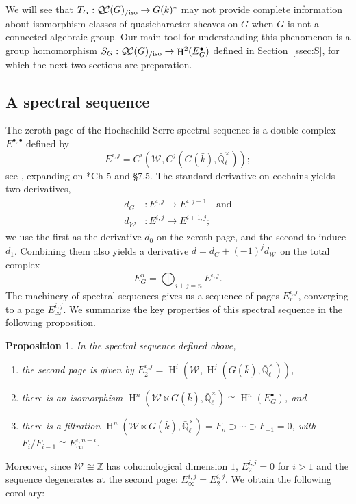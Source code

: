 \documentclass[CM,Submssn,SecEq]{degruyter-crelle} %
\theoremstyle{plain}
\newtheorem{proposition}[theorem]{Proposition}
\theoremstyle{definition}
\theoremstyle{remark}
\newcommand{\ZZ}{{\mathbb{Z}}}
\newcommand{\EE}{\mathbb{\bar Q}_\ell}
\newcommand{\bFq}{\bar{k}}
\newcommand{\Fq}{k}
\newcommand{\EEx}{\EE^\times}
\newcommand{\Weil}[1]{\mathcal{W}_{#1}}
\DeclareMathOperator{\Hh}{H}
\newcommand{\TrFrob}[1]{T_{#1}}
\newcommand{\QC}{{\mathcal{Q\hskip-0.8pt C}}}
\newcommand{\QCiso}[1]{\QC(#1)_{/\text{iso}}}
\begin{document}
We will see that $\TrFrob{G} : \QCiso{G} \to G(\Fq)^*$ may not provide complete
information about isomorphism classes of quasicharacter sheaves on $G$ when $G$ is not a connected algebraic group.
Our main tool for understanding this phenomenon
is a group homomorphism $S_G: \QCiso{G} \to \Hh^2(E^\bullet_G)$ defined in Section~\ref{ssec:S}, for which the next two sections are preparation.

\subsection{A spectral sequence}\label{ssec:E}

The zeroth page of the Hochschild-Serre spectral sequence
is a double complex $E^{\bullet, \bullet}$ defined by
\[
E^{i,j} = C^i(\Weil{}, C^j(G(\bFq), \EEx));
\]
see \cite{Vakil:spectral_sequences}, expanding on \cite{Weibel:Homological_Algebra}*{Ch 5 and \S 7.5}.
The standard derivative on cochains yields two derivatives,
\begin{align*}
d_G &: E^{i,j} \to E^{i,j+1} \quad \mbox{and} \\
d_{\Weil{}} &: E^{i,j} \to E^{i+1,j};
\end{align*}
we use the first as the derivative $d_0$ on the zeroth page, and the second to induce $d_1$.
Combining them also yields a derivative $d = d_G + (-1)^j d_{\Weil{}}$ on the total complex
\[
E^n_G = \bigoplus_{i+j=n} E^{i,j}.
\]
The machinery of spectral sequences gives us a sequence of pages $E_r^{i,j}$, converging to a page $E_{\infty}^{i,j}$. We summarize the key properties of this spectral sequence in the following proposition.

\begin{proposition} In the spectral sequence defined above,
\begin{enumerate}
\item the second page is given by $E_2^{i,j} = \Hh^i(\Weil{}, \Hh^j(G(\bFq), \EEx))$,
\item there is an isomorphism $\Hh^n(\Weil{} \ltimes G(\bFq), \EEx) \cong \Hh^n(E_G^\bullet)$, and
\item there is a filtration $\Hh^n(\Weil{} \ltimes G(\bFq), \EEx) = F_n \supset \cdots \supset F_{-1} = 0$, with $F_i / F_{i-1} \cong E_{\infty}^{i, n-i}$.
\end{enumerate}
\end{proposition}

Moreover, since $\Weil{} \cong \ZZ$ has cohomological dimension $1$, $E_2^{i,j} = 0$ for $i > 1$ and the sequence degenerates at the second page: $E_{\infty}^{i,j} = E_2^{i,j}$. We obtain the following corollary:
\end{document}
